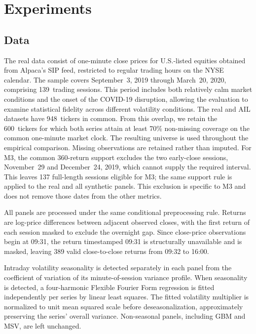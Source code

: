 \section{Experiments}\label{sec:experiments}

\subsection{Data}\label{sec:data}

{
{\color{black}The real data consist of one-minute close prices for U.S.-listed equities
obtained from Alpaca's SIP feed, restricted to regular trading hours on
the NYSE calendar.}
{\color{black}The sample covers September~3, 2019 through March~20, 2020, comprising
139~trading sessions.}
{\color{black}This period includes both relatively calm market conditions and the onset
of the COVID-19 disruption, allowing the evaluation to examine statistical
fidelity across different volatility conditions.}
{\color{black}The real and AIL datasets have 948~tickers in common.}
{\color{black}From this overlap, we retain the 600~tickers for which both series attain
at least 70\% non-missing coverage on the common one-minute market clock.}
{\color{black}The resulting universe is used throughout the empirical comparison.}
{\color{black}Missing observations are retained rather than imputed.}
For M3, the common 360-return support excludes the two early-close
sessions, November~29 and December~24, 2019, which cannot supply the
required interval.
This leaves 137 full-length sessions eligible for M3;
the same support rule is applied to the real and all synthetic panels.
This exclusion is specific to M3 and does not remove those dates from the
other metrics.
}

All panels are processed under the same conditional preprocessing rule.
Returns are log-price differences between adjacent observed closes, with the first return of each session masked to exclude the overnight gap.
Since close-price observations begin at 09:31, the return timestamped 09:31 is structurally unavailable and is masked, leaving 389 valid close-to-close returns from 09:32 to 16:00.

Intraday volatility seasonality is detected separately in each panel from the coefficient of variation of its minute-of-session variance profile.
When seasonality is detected, a four-harmonic Flexible Fourier Form regression \citep{andersen1997intraday} is fitted independently per series by linear least squares.
The fitted volatility multiplier is normalized to unit mean squared scale before deseasonalization, approximately preserving the series' overall variance.
Non-seasonal panels, including GBM and MSV, are left unchanged.


